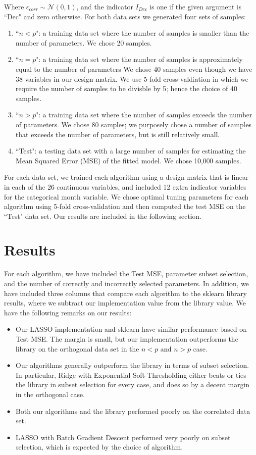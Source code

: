 \documentclass[11pt]{article}
\begin{document}
Where $\epsilon_{corr} \sim \mathcal{N}(0,1)$, and the indicator $I_{Dec}$ is one if the given argument is ``Dec" and zero otherwise.  For both data sets we generated four sets of samples:
\begin{enumerate}
	\item ``$n<p$": a training data set where the number of samples is smaller than the number of parameters.  We chose 20 samples.  
	\item ``$n=p$": a training data set where the number of samples is approximately equal to the number of parameters  We chose 40 samples even though we have 38 variables in our design matrix.  We use 5-fold cross-valdiation in which we require the number of samples to be divisble by 5; hence the choice of 40 samples.  
	\item ``$n>p$": a training data set where the number of samples exceeds the number of parameters.  We chose 80 samples; we purposely chose a number of samples that exceeds the number of parameters, but is still relatively small.  
	\item ``Test": a testing data set with a large number of samples for estimating the Mean Squared Error (MSE) of the fitted model.  We chose 10,000 samples.  
\end{enumerate}

For each data set, we trained each algorithm using a design matrix that is linear in each of the 26 continuous variables, and included 12 extra indicator variables for the categorical month variable.  We chose optimal tuning parameters for each algorithm using 5-fold cross-validation and then computed the test MSE on the ``Test" data set.  Our results are included in the following section.  


\section{Results}
For each algorithm, we have included the Test MSE, parameter subset selection, and the number of correctly and incorrectly selected parameters.  In addition, we have included three columns that compare each algorithm to the sklearn library results, where we subtract our implementation value from the library value.  We have the following remarks on our results:
\begin{itemize}
	\item Our LASSO implementation and sklearn have similar performance based on Test MSE.  The margin is small, but our implementation outperforms the library on the orthogonal data set in the $n<p$ and $n>p$ case.  
	\item Our algorithms generally outperform the library in terms of subset selection.  In particular, Ridge with Exponential Soft-Thresholding either beats or ties the library in subset selection for every case, and does so by a decent margin in the orthogonal case.  
	\item Both our algorithms and the library performed poorly on the correlated data set.  
	\item LASSO with Batch Gradient Descent performed very poorly on subset selection, which is expected by the choice of algorithm.  
\end{itemize}
\end{document}
